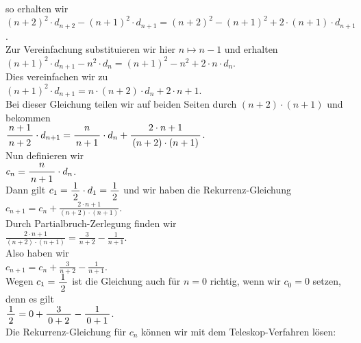 so erhalten wir \\[0.2cm]
\hspace*{1.3cm} 
$(n+2)^2 \cdot d_{n+2} - (n+1)^2 \cdot d_{n+1} = (n+2)^2 - (n+1)^2 + 2 \cdot (n+1) \cdot d_{n+1}$.
\\[0.2cm]
Zur Vereinfachung substituieren wir hier $n \mapsto n - 1$ und erhalten \\[0.2cm]
\hspace*{1.3cm} 
$(n+1)^2 \cdot d_{n+1} - n^2 \cdot d_{n} = (n+1)^2 - n^2 + 2 \cdot n \cdot d_{n}$.
\\[0.2cm]
Dies vereinfachen wir zu \\[0.2cm]
\hspace*{1.3cm} $(n+1)^2 \cdot d_{n+1}  =  n \cdot (n + 2) \cdot d_{n} + 2 \cdot n + 1$. \\[0.2cm]
Bei dieser Gleichung teilen wir auf beiden Seiten durch $(n+2)\cdot (n+1)$ und bekommen \\[0.2cm]
\hspace*{1.3cm}  
$\displaystyle \bruch{n+1}{n+2} \cdot d_{n+1}  =  \bruch{n}{n + 1} \cdot d_{n} + \bruch{2 \cdot n + 1}{(n+2)\cdot (n+1)}$. \\[0.2cm]
Nun definieren wir \\[0.2cm]
\hspace*{1.3cm} $\displaystyle c_n = \bruch{n}{n+1} \cdot d_n$. \\[0.2cm]
Dann gilt $c_1 = \bruch{1}{2} \cdot d_1 = \bruch{1}{2}$ und wir  haben die Rekurrenz-Gleichung \\[0.2cm]
\hspace*{1.3cm} 
$\displaystyle c_{n+1}  =  c_{n} + \frac{2 \cdot n + 1}{(n+2)\cdot (n+1)}$. \\[0.2cm]
Durch Partialbruch-Zerlegung finden wir \\[0.2cm]
\hspace*{1.3cm} 
$\displaystyle \frac{2 \cdot n + 1}{(n+2)\cdot (n+1)} = \frac{3}{n+2} - \frac{1}{n+1}$. \\[0.2cm]
Also haben wir \\[0.2cm]
\hspace*{1.3cm} $\displaystyle c_{n+1} = c_n +  \frac{3}{n+2} - \frac{1}{n+1}$. \\[0.2cm]
Wegen $c_1 = \bruch{1}{2}$ ist die Gleichung auch f\"ur $n=0$ richtig, wenn wir $c_0 = 0$ setzen, denn es gilt
\\[0.2cm]
\hspace*{1.3cm}
$\bruch{1}{2} = 0 + \bruch{3}{0+2} - \bruch{1}{0+1}$.
\\[0.2cm]
Die Rekurrenz-Gleichung f\"ur $c_n$ k\"onnen wir mit dem Teleskop-Verfahren l\"osen:
